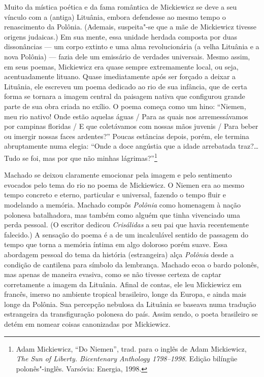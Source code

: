 {Muito da mística poética e da fama romântica de Mickiewicz se deve a seu
vínculo com a (antiga) Lituânia, embora defendesse ao mesmo tempo o
renascimento da Polônia. (Ademais, suspeita"-se que a mãe de Mickiewicz
tivesse origens judaicas.) Em sua mente, essa unidade herdada composta
por duas dissonâncias --- um corpo extinto e uma alma revolucionária (a
velha Lituânia e a nova Polônia) --- fazia dele um emissário de verdades
universais. Mesmo assim, em seus poemas, Mickiewicz era quase sempre
extremamente local, ou seja, acentuadamente lituano. Quase imediatamente
após ser forçado a deixar a Lituânia, ele escreveu um poema dedicado ao
rio de sua infância, que de certa forma se tornara a imagem central da
paisagem nativa que configurou grande parte de sua obra criada no
exílio. O poema começa como um hino: ``Niemen, meu rio nativo! Onde
estão aquelas águas / Para as quais nos arremessávamos por campinas
floridas / E que coletávamos com nossas mãos juvenis / Para beber ou
imergir nossas faces ardentes?'' Poucas estâncias depois, porém, ele
termina abruptamente numa elegia: ``Onde a doce angústia que a idade
arrebatada traz?\ldots{} Tudo se foi, mas por que não minhas
lágrimas?''\footnote{Adam Mickiewicz, ``Do Niemen'', trad. para o
  inglês de Adam Mickiewicz, \textit{The Sun of Liberty. Bicentenary
  Anthology 1798--1998}. Edição bilíngüe polonês"-inglês. Varsóvia:
  Energia, 1998.}

Machado se deixou claramente emocionar pela imagem e pelo sentimento
evocados pelo tema do rio no poema de Mickiewicz. O Niemen era ao mesmo
tempo concreto e eterno, particular e universal, fazendo o tempo fluir e
modelando a memória. Machado compôs \textit{Polônia} como homenagem à
nação polonesa batalhadora, mas também como alguém que tinha vivenciado
uma perda pessoal. (O escritor dedicou \textit{Crisálidas} a seu pai que
havia recentemente falecido.) A sensação do poema é a de um incalculável
sentido de passagem do tempo que torna a memória íntima em algo doloroso
porém suave. Essa abordagem pessoal do tema da história (estrangeira)
alça \textit{Polônia} desde a condição de cantilena para símbolo da
lembrança. Machado ecoa o bardo polonês, mas apenas de maneira evasiva,
como se não tivesse certeza de captar corretamente a imagem da Lituânia.
Afinal de contas, ele leu Mickiewicz em francês, imerso no ambiente
tropical brasileiro, longe da Europa, e ainda mais longe da Polônia. Sua
percepção nebulosa da Lituânia se baseava numa tradução estrangeira da
transfiguração polonesa do país. Assim sendo, o poeta brasileiro se
detém em nomear coisas canonizadas por Mickiewicz.

}
